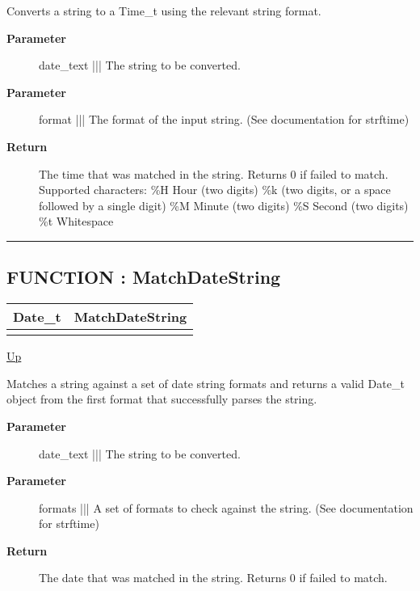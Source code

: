 \par
Converts a string to a Time\_t using the relevant string format.

\par
\begin{description}
\item [\textbf{Parameter}] date\_text ||| The string to be converted.
\item [\textbf{Parameter}] format ||| The format of the input string. (See documentation for strftime)
\item [\textbf{Return}] The time that was matched in the string. Returns 0 if failed to match. Supported characters: \%H Hour (two digits) \%k (two digits, or a space followed by a single digit) \%M Minute (two digits) \%S Second (two digits) \%t Whitespace
\end{description}

\rule{\textwidth}{0.4pt}
\subsection*{FUNCTION : MatchDateString}
\hypertarget{ecldoc:date.matchdatestring}{}

{\renewcommand{\arraystretch}{1.5}
\begin{tabularx}{\textwidth}{|>{\raggedright\arraybackslash}l|X|}
\hline
\hspace{0pt}Date\_t & MatchDateString \\
\hline
\multicolumn{2}{|>{\raggedright\arraybackslash}X|}{\hspace{0pt}(STRING date\_text, SET OF VARSTRING formats)} \\
\hline
\end{tabularx}
}

\hyperlink{ecldoc:Date}{Up}

\par
Matches a string against a set of date string formats and returns a valid Date\_t object from the first format that successfully parses the string.

\par
\begin{description}
\item [\textbf{Parameter}] date\_text ||| The string to be converted.
\item [\textbf{Parameter}] formats ||| A set of formats to check against the string. (See documentation for strftime)
\item [\textbf{Return}] The date that was matched in the string. Returns 0 if failed to match.
\end{description}

